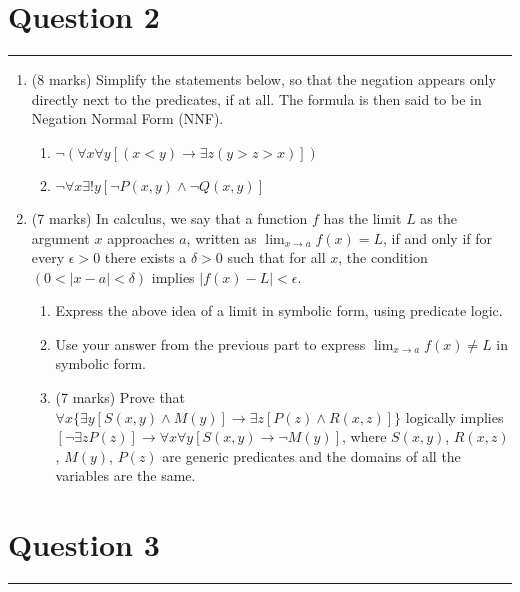 \documentclass{article}
\begin{document}
\section*{Question 2}
\hrule
\vspace{0.5cm}


\begin{enumerate}[label=\alph*.]
    \item (8 marks) Simplify the statements below, so that the negation appears only directly next to the predicates,
          if at all. The formula is then said to be in Negation Normal Form (NNF).
          \begin{enumerate}[label=\roman*.]
              \item $\neg(\forall x\forall y\left[(x<y)\to\exists z\left(y>z>x\right)\right])$
              \item $\lnot\forall x\exists!y\left[\lnot P(x,y)\land\lnot Q(x,y)\right]$
          \end{enumerate}
    \item (7 marks) In calculus, we say that a function \(f\) has the limit \(L\) as the argument \(x\) approaches \(a\), written as \(\lim_{x \to a} f(x) = L\), if and only if for every \(\epsilon > 0\) there exists a \(\delta > 0\) such that for all \(x\), the condition \((0 < |x − a| < \delta)\) implies \(| f (x) − L| < \epsilon\).
          \begin{enumerate}[label=\roman*.]
              \item Express the above idea of a limit in symbolic form, using predicate logic.
              \item Use your answer from the previous part to express \(\lim_{x \to a} f(x) \neq L\) in symbolic form.
              \item (7 marks) Prove that \( \forall x \{ \exists y [S(x, y) \land M(y)] \rightarrow \exists z [P(z) \land R(x, z)] \} \) logically implies \( [\neg \exists z P(z)] \rightarrow \forall x \forall y [S(x, y) \rightarrow \neg M(y)] \), where \( S(x, y) \), \( R(x, z) \), \( M(y) \), \( P(z) \) are generic predicates and the domains of all the variables are the same.
          \end{enumerate}
\end{enumerate}

\section*{Question 3}
\hrule
\vspace{0.5cm}
\end{document}
